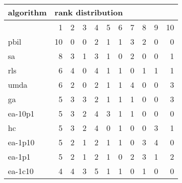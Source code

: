 \begin{tabular}{@{}l*{10}{r}@{}}
\toprule
algorithm & \multicolumn{10}{l}{{rank distribution}}\\
\midrule
& 1 & 2 & 3 & 4 & 5 & 6 & 7 & 8 & 9 & 10\\
\midrule
pbil & 10 & 0 & 0 & 2 & 1 & 1 & 3 & 2 & 0 & 0\\
sa & 8 & 3 & 1 & 3 & 1 & 0 & 2 & 0 & 0 & 1\\
rls & 6 & 4 & 0 & 4 & 1 & 1 & 0 & 1 & 1 & 1\\
umda & 6 & 2 & 0 & 2 & 1 & 1 & 4 & 0 & 0 & 3\\
ga & 5 & 3 & 3 & 2 & 1 & 1 & 1 & 0 & 0 & 3\\
ea-10p1 & 5 & 3 & 2 & 4 & 3 & 1 & 1 & 0 & 0 & 0\\
hc & 5 & 3 & 2 & 4 & 0 & 1 & 0 & 0 & 3 & 1\\
ea-1p10 & 5 & 2 & 1 & 2 & 1 & 1 & 0 & 3 & 4 & 0\\
ea-1p1 & 5 & 2 & 1 & 2 & 1 & 0 & 2 & 3 & 1 & 2\\
ea-1c10 & 4 & 4 & 3 & 5 & 1 & 1 & 0 & 1 & 0 & 0\\
\bottomrule
\end{tabular}
